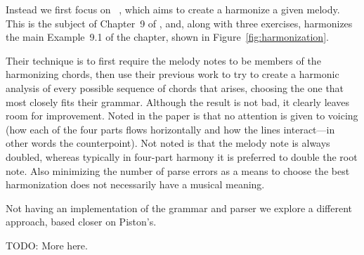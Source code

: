 Instead we first focus on \fharm~\citep{koops-fharm}, which aims to create a
harmonize a given melody. This is the subject of Chapter~9 of 
\citet{piston-harmony}, and, along with three exercises,
\fharm harmonizes the main Example~9.1 of the chapter,
shown in Figure~\ref{fig:harmonization}.

\Harmonization

Their technique is to first require the melody notes to be members of
the harmonizing chords, then use their previous work to try to
create a harmonic analysis of every possible sequence of chords that
arises, choosing the one that most closely fits their
grammar. Although the result is not bad, it clearly leaves room for
improvement. Noted in the paper is that no attention is given to
voicing (how each of the four parts flows horizontally and how the
lines interact---in other words the counterpoint). Not noted is that
the melody note is always doubled, whereas typically in four-part
harmony it is preferred to double the root note. Also minimizing the
number of parse errors as a means to choose the best harmonization
does not necessarily have a musical meaning.

Not having an implementation of the grammar and parser we explore a
different approach, based closer on Piston's.

TODO: More here.
